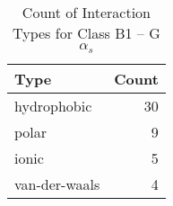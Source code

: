 \begin{table}[!h]

\caption{\label{tab:interaction-types-b1-gs}Count of Interaction Types for Class B1 – G$\alpha_{s}$}
\centering
\begin{tabular}{lr}
\toprule
Type & Count\\
\midrule
hydrophobic & 30\\
polar & 9\\
ionic & 5\\
van-der-waals & 4\\
\bottomrule
\end{tabular}
\end{table}
